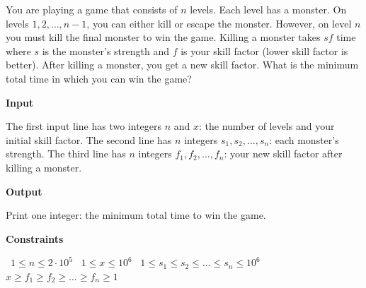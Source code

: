 You are playing a game that consists of $n$ levels. Each level has a monster. On levels $1,2,\dots,n-1$, you can either kill or escape the monster. However, on level $n$ you must kill the final monster to win the game.
Killing a monster takes $sf$ time where $s$ is the monster's strength and $f$ is your skill factor (lower skill factor is better). After killing a monster, you get a new skill factor. What is the minimum total time in which you can win the game?

\vspace{0.3cm}\noindent\textbf{Input}

The first input line has two integers $n$ and $x$: the number of levels and your initial skill factor.
The second line has $n$ integers $s_1,s_2,\dots,s_n$: each monster's strength.
The third line has $n$ integers $f_1,f_2,\dots,f_n$: your new skill factor after killing a monster.

\vspace{0.3cm}\noindent\textbf{Output}

Print one integer: the minimum total time to win the game.

\vspace{0.3cm}\noindent\textbf{Constraints}

\textbullet\ $1 \le n \le 2 \cdot 10^5$
\textbullet\ $1 \le x \le 10^6$
\textbullet\ $1 \le s_1 \le s_2 \le \dots \le s_n \le 10^6$
\textbullet\ $x \ge f_1 \ge f_2 \ge \dots \ge f_n \ge 1$